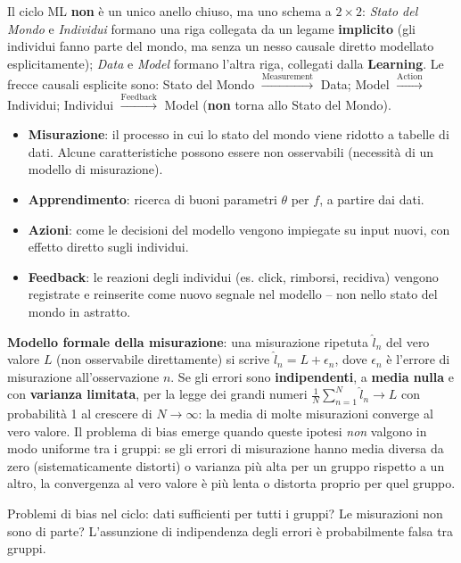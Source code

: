 \documentclass[a4paper,11pt]{article}
\begin{document}
\begin{definizione}[Ciclo ML]
Il ciclo ML \textbf{non} \`{e} un unico anello chiuso, ma uno schema a $2\times 2$: \emph{Stato del Mondo} e \emph{Individui} formano una riga collegata da un legame \textbf{implicito} (gli individui fanno parte del mondo, ma senza un nesso causale diretto modellato esplicitamente); \emph{Data} e \emph{Model} formano l'altra riga, collegati dalla \textbf{Learning}. Le frecce causali esplicite sono: Stato del Mondo $\xrightarrow{\text{Measurement}}$ Data; Model $\xrightarrow{\text{Action}}$ Individui; Individui $\xrightarrow{\text{Feedback}}$ Model (\textbf{non} torna allo Stato del Mondo).

\begin{itemize}
  \item \textbf{Misurazione}: il processo in cui lo stato del mondo viene ridotto a tabelle di dati. Alcune caratteristiche possono essere non osservabili (necessit\`{a} di un modello di misurazione).
  \item \textbf{Apprendimento}: ricerca di buoni parametri $\theta$ per $f$, a partire dai dati.
  \item \textbf{Azioni}: come le decisioni del modello vengono impiegate su input nuovi, con effetto diretto sugli individui.
  \item \textbf{Feedback}: le reazioni degli individui (es. click, rimborsi, recidiva) vengono registrate e reinserite come nuovo segnale nel modello -- non nello stato del mondo in astratto.
\end{itemize}

\textbf{Modello formale della misurazione}: una misurazione ripetuta $\hat{l}_n$ del vero valore $L$ (non osservabile direttamente) si scrive $\hat{l}_n = L + \epsilon_n$, dove $\epsilon_n$ \`{e} l'errore di misurazione all'osservazione $n$. Se gli errori sono \textbf{indipendenti}, a \textbf{media nulla} e con \textbf{varianza limitata}, per la legge dei grandi numeri $\frac{1}{N}\sum_{n=1}^N \hat{l}_n \to L$ con probabilit\`{a} 1 al crescere di $N \to \infty$: la media di molte misurazioni converge al vero valore. Il problema di bias emerge quando queste ipotesi \emph{non} valgono in modo uniforme tra i gruppi: se gli errori di misurazione hanno media diversa da zero (sistematicamente distorti) o varianza pi\`{u} alta per un gruppo rispetto a un altro, la convergenza al vero valore \`{e} pi\`{u} lenta o distorta proprio per quel gruppo.

Problemi di bias nel ciclo: dati sufficienti per tutti i gruppi? Le misurazioni non sono di parte? L'assunzione di indipendenza degli errori \`{e} probabilmente falsa tra gruppi.
\end{definizione}
\end{document}
